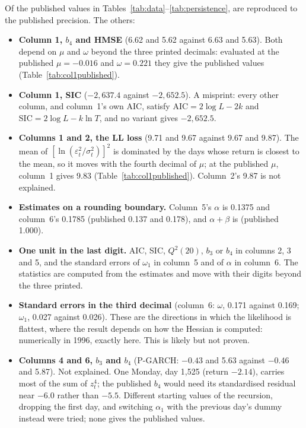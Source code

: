 \documentclass[11pt]{article}
\begin{document}
Of the \nvalues{} published values in Tables~\ref{tab:data}--\ref{tab:persistence}, \nfull{} are reproduced to the published precision. The others:

\begin{itemize}
  \item \textbf{Column 1, $b_4$ and HMSE} (6.62 and 5.62 against 6.63 and 5.63). Both depend on $\mu$ and $\omega$ beyond the three printed decimals: evaluated at the published $\mu = -0.016$ and $\omega = 0.221$ they give the published values (Table~\ref{tab:col1published}).
  \item \textbf{Column 1, SIC} ($-2{,}637.4$ against $-2{,}652.5$). A misprint: every other column, and column~1's own AIC, satisfy $\text{AIC} = 2\log L - 2k$ and $\text{SIC} = 2\log L - k\ln T$, and no variant gives $-2{,}652.5$.
  \item \textbf{Columns 1 and 2, the LL loss} (9.71 and 9.67 against 9.67 and 9.87). The mean of $[\ln(\varepsilon_t^2/\sigma_t^2)]^2$ is dominated by the days whose return is closest to the mean, so it moves with the fourth decimal of $\mu$; at the published $\mu$, column~1 gives 9.83 (Table~\ref{tab:col1published}). Column~2's 9.87 is not explained.
  \item \textbf{Estimates on a rounding boundary.} Column~5's $\alpha$ is 0.1375 and column~6's 0.1785 (published 0.137 and 0.178), and $\alpha + \beta$ is \persistord{} (published 1.000).
  \item \textbf{One unit in the last digit.} AIC, SIC, $Q^2(20)$, $b_3$ or $b_4$ in columns 2, 3 and 5, and the standard errors of $\omega_1$ in column~5 and of $\alpha$ in column~6. The statistics are computed from the estimates and move with their digits beyond the three printed.
  \item \textbf{Standard errors in the third decimal} (column~6: $\omega$, 0.171 against 0.169; $\omega_1$, 0.027 against 0.026). These are the directions in which the likelihood is flattest, where the result depends on how the Hessian is computed: numerically in 1996, exactly here. This is likely but not proven.
  \item \textbf{Columns 4 and 6, $b_3$ and $b_4$} (P-GARCH: $-0.43$ and 5.63 against $-0.46$ and 5.87). Not explained. One Monday, day 1,525 (return $-2.14$), carries most of the sum of $z_t^4$; the published $b_4$ would need its standardised residual near $-6.0$ rather than $-5.5$. Different starting values of the recursion, dropping the first day, and switching $\alpha_1$ with the previous day's dummy instead were tried; none gives the published values.
\end{itemize}
\end{document}
